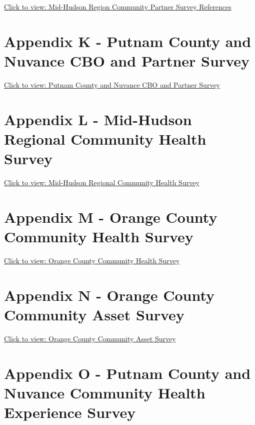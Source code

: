\documentclass[
  english,
  letterpaper,
]{report}
\begin{document}
\href{../media/appendix-docs/Mid-Hudson\%20Region\%20Community\%20Partner\%20Survey\%20References.pdf}{Click
to view: Mid-Hudson Region Community Partner Survey References}

\section{Appendix K - Putnam County and Nuvance CBO and Partner
Survey}\label{sec-appendix-k-putnam-nuvance-cbo-survey}

\href{../media/appendix-docs/K\%20-\%20Putnam\%20CBO\%20Survey_English_FINAL.pdf}{Click
to view: Putnam County and Nuvance CBO and Partner Survey}

\section{Appendix L - Mid-Hudson Regional Community Health
Survey}\label{sec-appendix-l-mid-hudson-regional-community-health-survey}

\href{../media/appendix-docs/L\%20-\%20Dutchess\%20and\%20Putnam\%20HVHealth0325_FinalQnaire.pdf}{Click
to view: Mid-Hudson Regional Community Health Survey}

\section{Appendix M - Orange County Community Health
Survey}\label{sec-appendix-m-orange-county-community-health-survey}

\href{../media/appendix-docs/M\%20-\%202024\%20Script\%20(0524OCHealthWeb_Prn).pdf}{Click
to view: Orange County Community Health Survey}

\section{Appendix N - Orange County Community Asset
Survey}\label{sec-appendix-n-orange-county-community-asset-survey}

\href{../media/appendix-docs/N\%20-\%20Community\%20Asset\%20Survey\%20ENG.pdf}{Click
to view: Orange County Community Asset Survey}

\section{Appendix O - Putnam County and Nuvance Community Health
Experience
Survey}\label{sec-appendix-o-putnam-nuvance-community-health-experience-survey}
\end{document}
